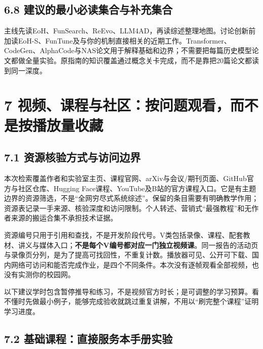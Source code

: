 \subsection{6.8
建议的最小必读集合与补充集合}\label{ux5efaux8baeux7684ux6700ux5c0fux5fc5ux8bfbux96c6ux5408ux4e0eux8865ux5145ux96c6ux5408}

主线先读EoH、FunSearch、ReEvo、LLM4AD，再读综述整理地图。讨论创新前加读EoH-S、FunTune及与你的机制直接相关的近期工作。Transformer、CodeGen、AlphaCode与NAS论文用于解释基础和边界；不需要把每篇历史模型论文都做全量实验。原指南的知识覆盖通过概念关卡完成，而不是靠把20篇论文都读到同一深度。

\section{7
视频、课程与社区：按问题观看，而不是按播放量收藏}\label{ux89c6ux9891ux8bfeux7a0bux4e0eux793eux533aux6309ux95eeux9898ux89c2ux770bux800cux4e0dux662fux6309ux64adux653eux91cfux6536ux85cf}

\subsection{7.1
资源核验方式与访问边界}\label{ux8d44ux6e90ux6838ux9a8cux65b9ux5f0fux4e0eux8bbfux95eeux8fb9ux754c}

本次检索覆盖作者和实验室主页、课程官网、arXiv与会议/期刊页面、GitHub官方与社区仓库、Hugging
Face课程、YouTube及B站的官方课程入口。它是有主题边界的资源筛选，不是``全网穷尽式系统综述''。保留的条目需要有明确教学作用；资源表记录一手来源、核验深度和访问限制。个人转述、营销式``最强教程''和无作者来源的搬运合集不承担技术证据。

资源编号只用于引用和查找，不是开发阶段代号。V类包括录像、课程、配套教材、讲义与媒体入口；\textbf{不是每个V编号都对应一门独立视频课}。同一报告的活动页与录像页分列，是为了提高可找回性，不重复计数。播放器可见、公开可下载、国内网络可访问和能否完成作业，是四个不同条件。本次没有逐帧观看全部视频，也没有实测你的校园网。

以下建议学时包含暂停推导和练习，不是视频官方时长；是可调整的学习预算。看不懂时先做最小例子，能够完成验收就跳过重复讲解，不用以``刷完整个课程''证明学习进度。

\subsection{7.2
基础课程：直接服务本手册实验}\label{ux57faux7840ux8bfeux7a0bux76f4ux63a5ux670dux52a1ux672cux624bux518cux5b9eux9a8c}

